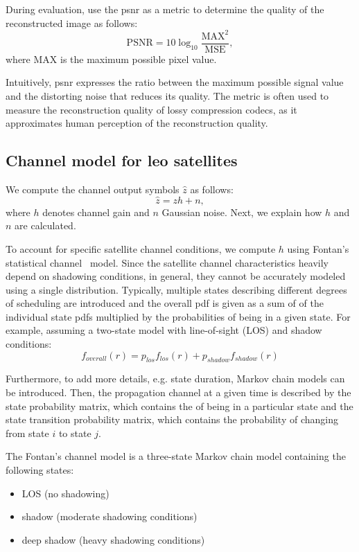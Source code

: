 \documentclass[conference]{IEEEtran}
\begin{document}
During evaluation, use the \ac{psnr} as a metric to determine the quality of the reconstructed image as follows:
%
\begin{equation}
  \mathrm{PSNR} = 10 \log_{10}\frac{\mathrm{MAX}^2}{\mathrm{MSE}},
\end{equation}
%
where $\mathrm{MAX}$ is the maximum possible pixel value.

Intuitively, \ac{psnr} expresses the ratio between the maximum possible signal value and the distorting noise that reduces its quality.
The metric is often used to measure the reconstruction quality of lossy compression codecs, as it approximates human perception of the reconstruction quality.


\subsection{Channel model for \ac{leo} satellites}
\label{sub:channel_model}
We compute the channel output symbols $\hat{z}$ as follows:
\begin{equation}
  \hat{z} = zh + n,
\end{equation}
where $h$ denotes channel gain and $n$ Gaussian noise.
Next, we explain how $h$ and $n$ are calculated.

To account for specific satellite channel conditions, we compute $h$ using Fontan's statistical channel~\cite{} model. 
Since the satellite channel characteristics heavily depend on shadowing conditions, in general, 
they cannot be accurately modeled using a single distribution.
Typically, multiple states describing different degrees of scheduling are introduced 
and the overall pdf is given as a sum of of the individual state pdfs multiplied by the probabilities of being in a given state.
For example, assuming a two-state model with line-of-sight (LOS) and shadow conditions: 
\begin{equation}
f_{overall}(r) = p_{los}f_{los}(r) + p_{shadow}f_{shadow}(r)
\end{equation}

Furthermore, to add more details, e.g. state duration, Markov chain models can be introduced.
Then, the propagation channel at a given time is described by the state probability matrix, which contains the of being in a particular state
and the state transition probability matrix, which contains the probability of changing from state $i$ to state $j$.

The Fontan's channel model is a three-state Markov chain model containing the following states:
\begin{itemize}
  \item LOS (no shadowing)
  \item shadow (moderate shadowing conditions)
  \item deep shadow (heavy shadowing conditions)
\end{itemize}
\end{document}
